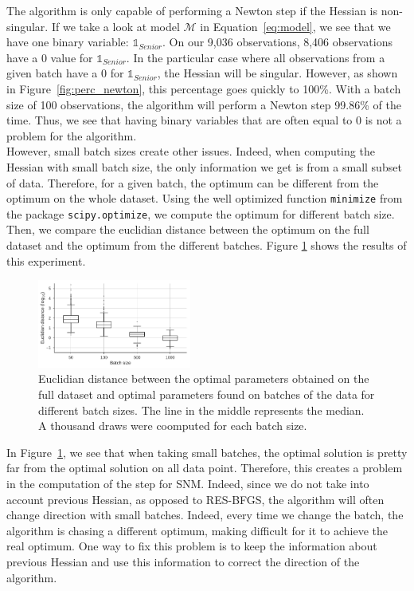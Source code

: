 \documentclass[conference]{IEEEtran}
\begin{document}
The algorithm is only capable of performing a Newton step if the Hessian is non-singular. If we take a look at model $\mathcal{M}$ in Equation~\ref{eq:model}, we see that we have one binary variable: $\mathbb{1}_{Senior}$. On our 9,036 observations, 8,406 observations have a 0 value for $\mathbb{1}_{Senior}$. In the particular case where all observations from a given batch have a 0 for $\mathbb{1}_{Senior}$, the Hessian will be singular. However, as shown in Figure~\ref{fig:perc_newton}, this percentage goes quickly to 100\%. With a batch size of 100 observations, the algorithm will perform a Newton step 99.86\% of the time. Thus, we see that having binary variables that are often equal to 0 is not a problem for the algorithm. \\

However, small batch sizes create other issues. Indeed, when computing the Hessian with small batch size, the only information we get is from a small subset of data. Therefore, for a given batch, the optimum can be different from the optimum on the whole dataset. Using the well optimized function \texttt{minimize} from the package \texttt{scipy.optimize}, we compute the optimum for different batch size. Then, we compare the euclidian distance between the optimum on the full dataset and the optimum from the different batches. Figure \ref{fig:batch_dist} shows the results of this experiment.

\begin{figure}[t]
\centering
\includegraphics[width=0.45\textwidth]{../figures/dist.pdf}
\vspace{-0.3cm}
\caption{Euclidian distance between the optimal parameters obtained on the full dataset and optimal parameters found on batches of the data for different batch sizes. The line in the middle represents the median. A thousand draws were coomputed for each batch size.}
\label{fig:batch_dist}
\vspace{-0.5cm}
\end{figure}

In Figure~\ref{fig:batch_dist}, we see that when taking small batches, the optimal solution is pretty far from the optimal solution on all data point. Therefore, this creates a problem in the computation of the step for SNM. Indeed, since we do not take into account previous Hessian, as opposed to RES-BFGS, the algorithm will often change direction with small batches. Indeed, every time we change the batch, the algorithm is chasing a different optimum, making difficult for it to achieve the real optimum. One way to fix this problem is to keep the information about previous Hessian and use this information to correct the direction of the algorithm.
\end{document}
